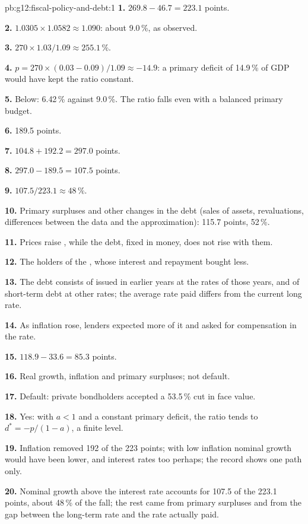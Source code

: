 \begin{solution}{pb:g12:fiscal-policy-and-debt:1}
\textbf{1.} $269.8 - 46.7 = 223.1$ points.

\textbf{2.} $1.0305 \times 1.0582 \approx 1.090$: about 9.0\,\%, as observed.

\textbf{3.} $270 \times 1.03/1.09 \approx 255.1\,\%$.

\textbf{4.} $p = 270 \times (0.03 - 0.09)/1.09 \approx -14.9$: a primary deficit of 14.9\,\% of GDP would have kept the ratio constant.

\textbf{5.} Below: 6.42\,\% against 9.0\,\%. The ratio falls even with a balanced primary budget.

\textbf{6.} 189.5 points.

\textbf{7.} $104.8 + 192.2 = 297.0$ points.

\textbf{8.} $297.0 - 189.5 = 107.5$ points.

\textbf{9.} $107.5/223.1 \approx 48\,\%$.

\textbf{10.} Primary surpluses and other changes in the debt (sales of assets, revaluations, differences between the data and the approximation): 115.7 points, 52\,\%.

\textbf{11.} Prices raise , while the debt, fixed in money, does not rise with them.

\textbf{12.} The holders of the , whose interest and repayment bought less.

\textbf{13.} The debt consists of  issued in earlier years at the rates of those years, and of short-term debt at other rates; the average rate paid differs from
the current long rate.

\textbf{14.} As inflation rose, lenders expected more of it and asked for compensation in the rate.

\textbf{15.} $118.9 - 33.6 = 85.3$ points.

\textbf{16.} Real growth, inflation and primary surpluses; not default.

\textbf{17.} Default: private bondholders accepted a 53.5\,\% cut in face value.

\textbf{18.} Yes: with $a < 1$ and a constant primary deficit, the ratio tends to $d^* = -p/(1 - a)$, a finite level.

\textbf{19.} Inflation removed 192 of the 223 points; with low inflation nominal growth would have been lower, and interest rates too perhaps; the record shows one path
only.

\textbf{20.} Nominal growth above the interest rate accounts for 107.5 of the 223.1 points, about 48\,\% of the fall; the rest came from primary surpluses and from the gap between the long-term rate and the rate actually paid.
\end{solution}
